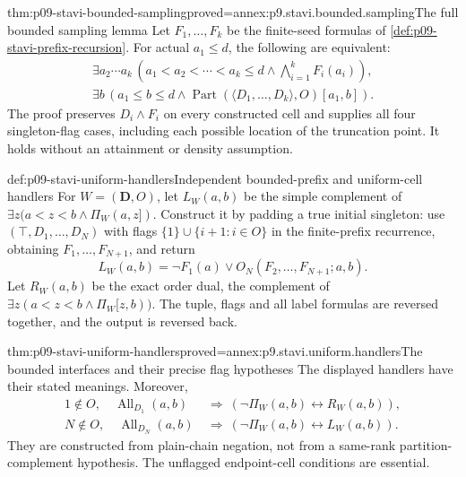 \begin{hblemma}{thm:p09-stavi-bounded-sampling}{proved=annex:p9.stavi.bounded.sampling}{The full bounded sampling lemma}
Let \(F_1,\ldots,F_k\) be the finite-seed
formulas of \cref{def:p09-stavi-prefix-recursion}.
For actual \(a_1\leq d\), the following
are equivalent:
\[
\begin{gathered}
 \exists a_2\cdots a_k\,
       (a_1<a_2<\cdots<a_k\leq d
                         \land\bigwedge_{i=1}^kF_i(a_i)),\\
 \exists b\,(a_1\leq b\leq d\land
                 \operatorname{Part}(\langle D_1,\ldots,D_k\rangle,O)[a_1,b]).
\end{gathered}
\]
The proof preserves \(D_i\land F_i\)
on every constructed cell and supplies
all four singleton-flag cases, including
each possible location of the truncation
point. It holds without an attainment
or density assumption.
\end{hblemma}

\begin{hbdefinition}{def:p09-stavi-uniform-handlers}{Independent bounded-prefix and uniform-cell handlers}
For \(W=(\mathbf D,O)\), let \(L_W(a,b)\)
be the simple complement of
\(\exists z(a<z<b\land\Pi_W(a,z])\).
Construct it by padding a true initial
singleton: use \((\top,D_1,\ldots,D_N)\)
with flags \(\{1\}\cup\{i+1:i\in O\}\)
in the finite-prefix recurrence, obtaining
\(F_1,\ldots,F_{N+1}\), and return
\[
              L_W(a,b)=\neg F_1(a)\lor O_N(F_2,\ldots,F_{N+1};a,b).
\]
Let \(R_W(a,b)\) be the exact order dual,
the complement of
\(\exists z(a<z<b\land\Pi_W[z,b))\).
The tuple, flags and all label formulas
are reversed together, and the output
is reversed back.
\end{hbdefinition}

\begin{hblemma}{thm:p09-stavi-uniform-handlers}{proved=annex:p9.stavi.uniform.handlers}{The bounded interfaces and their precise flag hypotheses}
The displayed handlers have their stated
meanings. Moreover,
\[
\begin{aligned}
 1\notin O,\quad \operatorname{All}_{D_1}(a,b)
 &\ \Longrightarrow\
             (\neg\Pi_W(a,b)\leftrightarrow R_W(a,b)),\\
 N\notin O,\quad \operatorname{All}_{D_N}(a,b)
 &\ \Longrightarrow\
             (\neg\Pi_W(a,b)\leftrightarrow L_W(a,b)).
\end{aligned}
\]
They are constructed from plain-chain negation,
not from a same-rank partition-complement
hypothesis. The unflagged endpoint-cell
conditions are essential.
\end{hblemma}

